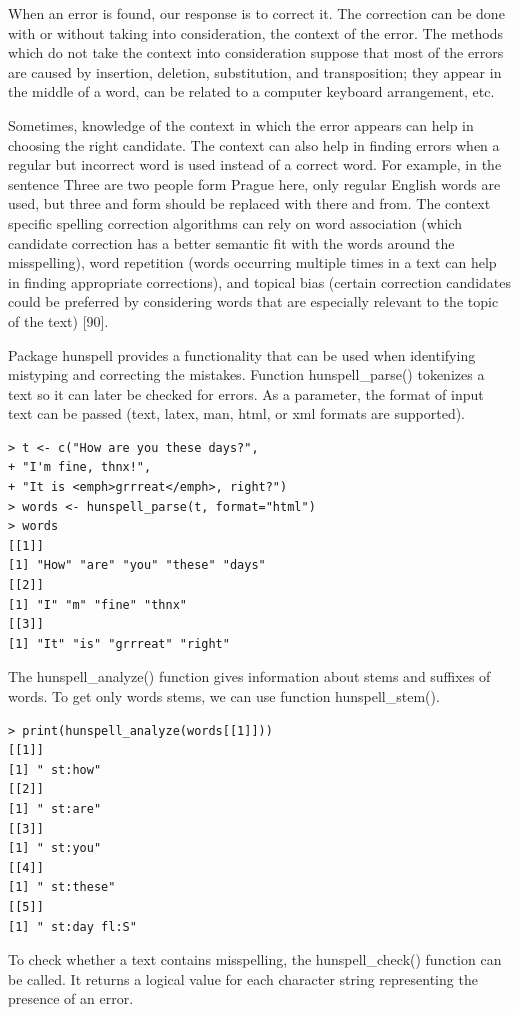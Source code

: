 \documentclass[10pt]{book}
\begin{document}
When an error is found, our response is to correct it. The correction can be done with or without taking into consideration, the context of the error. The methods which do not take the context into consideration suppose that most of the errors are caused by insertion, deletion, substitution, and transposition; they appear in the middle of a word, can be related to a computer keyboard arrangement, etc.

Sometimes, knowledge of the context in which the error appears can help in choosing the right candidate. The context can also help in finding errors when a regular but incorrect word is used instead of a correct word. For example, in the sentence Three are two people form Prague here, only regular English words are used, but three and form should be replaced with there and from. The context specific spelling correction algorithms can rely on word association (which candidate correction has a better semantic fit with the words around the misspelling), word repetition (words occurring multiple times in a text can help in finding appropriate corrections), and topical bias (certain correction candidates could be preferred by considering words that are especially relevant to the topic of the text) [90].

Package hunspell provides a functionality that can be used when identifying mistyping and correcting the mistakes. Function hunspell\_parse() tokenizes a text so it can later be checked for errors. As a parameter, the format of input text can be passed (text, latex, man, html, or xml formats are supported).

\begin{verbatim}
> t <- c("How are you these days?",
+ "I'm fine, thnx!",
+ "It is <emph>grrreat</emph>, right?")
> words <- hunspell_parse(t, format="html")
> words
[[1]]
[1] "How" "are" "you" "these" "days"
[[2]]
[1] "I" "m" "fine" "thnx"
[[3]]
[1] "It" "is" "grrreat" "right"
\end{verbatim}

The hunspell\_analyze() function gives information about stems and suffixes of words. To get only words stems, we can use function hunspell\_stem().

\begin{verbatim}
> print(hunspell_analyze(words[[1]]))
[[1]]
[1] " st:how"
[[2]]
[1] " st:are"
[[3]]
[1] " st:you"
[[4]]
[1] " st:these"
[[5]]
[1] " st:day fl:S"
\end{verbatim}

To check whether a text contains misspelling, the hunspell\_check() function can be called. It returns a logical value for each character string representing the presence of an error.
\end{document}
